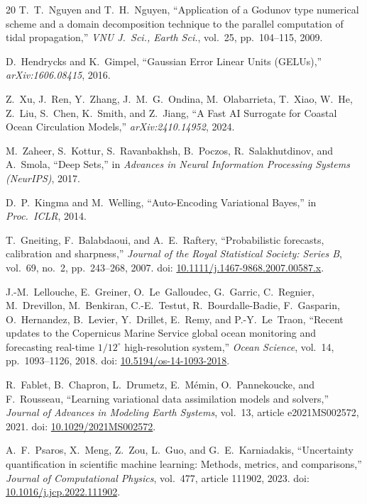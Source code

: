 \documentclass[11pt,a4paper]{article}
\begin{document}
\begin{thebibliography}{20}
T.~T.~Nguyen and T.~H.~Nguyen,
``Application of a Godunov type numerical scheme and a domain decomposition technique to the parallel computation of tidal propagation,''
\textit{VNU J.\ Sci., Earth Sci.}, vol.~25, pp.~104--115, 2009.

D.~Hendrycks and K.~Gimpel,
``Gaussian Error Linear Units (GELUs),''
\textit{arXiv:1606.08415}, 2016.

Z.~Xu, J.~Ren, Y.~Zhang, J.~M.~G.~Ondina, M.~Olabarrieta, T.~Xiao, W.~He, Z.~Liu, S.~Chen, K.~Smith, and Z.~Jiang,
``A Fast AI Surrogate for Coastal Ocean Circulation Models,''
\emph{arXiv:2410.14952}, 2024.

M.~Zaheer, S.~Kottur, S.~Ravanbakhsh, B.~Poczos, R.~Salakhutdinov, and A.~Smola,
``Deep Sets,''
in \emph{Advances in Neural Information Processing Systems (NeurIPS)}, 2017.

D.~P.~Kingma and M.~Welling,
``Auto-Encoding Variational Bayes,''
in \emph{Proc.\ ICLR}, 2014.

T.~Gneiting, F.~Balabdaoui, and A.~E.~Raftery,
``Probabilistic forecasts, calibration and sharpness,''
\textit{Journal of the Royal Statistical Society: Series B}, vol.~69, no.~2, pp.~243--268, 2007.
doi: \href{https://doi.org/10.1111/j.1467-9868.2007.00587.x}{10.1111/j.1467-9868.2007.00587.x}.

J.-M.~Lellouche, E.~Greiner, O.~Le~Galloudec, G.~Garric, C.~Regnier, M.~Drevillon, M.~Benkiran, C.-E.~Testut, R.~Bourdalle-Badie, F.~Gasparin, O.~Hernandez, B.~Levier, Y.~Drillet, E.~Remy, and P.-Y.~Le~Traon,
``Recent updates to the Copernicus Marine Service global ocean monitoring and forecasting real-time $1/12^\circ$ high-resolution system,''
\textit{Ocean Science}, vol.~14, pp.~1093--1126, 2018.
doi: \href{https://doi.org/10.5194/os-14-1093-2018}{10.5194/os-14-1093-2018}.

R.~Fablet, B.~Chapron, L.~Drumetz, E.~M\'{e}min, O.~Pannekoucke, and F.~Rousseau,
``Learning variational data assimilation models and solvers,''
\textit{Journal of Advances in Modeling Earth Systems}, vol.~13, article e2021MS002572, 2021.
doi: \href{https://doi.org/10.1029/2021MS002572}{10.1029/2021MS002572}.

A.~F.~Psaros, X.~Meng, Z.~Zou, L.~Guo, and G.~E.~Karniadakis,
``Uncertainty quantification in scientific machine learning: Methods, metrics, and comparisons,''
\textit{Journal of Computational Physics}, vol.~477, article 111902, 2023.
doi: \href{https://doi.org/10.1016/j.jcp.2022.111902}{10.1016/j.jcp.2022.111902}.


\end{thebibliography}
\end{document}
